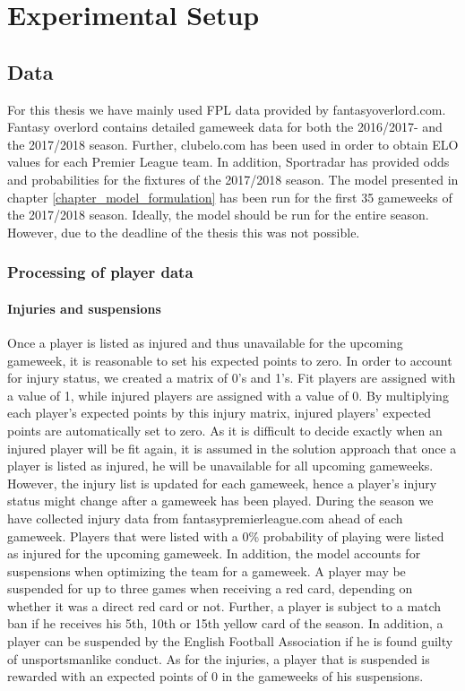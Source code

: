 \chapter{Experimental Setup}\label{chapter_experimental_setup}



\section{Data}
For this thesis we have mainly used FPL data provided by fantasyoverlord.com. Fantasy overlord contains detailed gameweek data for both the 2016/2017- and the 2017/2018 season. Further, clubelo.com has been used in order to obtain ELO values for each Premier League team. In addition, Sportradar has provided odds and probabilities for the fixtures of the 2017/2018 season. 
\newpar
The model presented in chapter \ref{chapter_model_formulation} has been run for the first 35 gameweeks of the 2017/2018 season. Ideally, the model should be run for the entire season. However, due to the deadline of the thesis this was not possible. 

\subsection{Processing of player data}
\subsubsection{Injuries and suspensions}
Once a player is listed as injured and thus unavailable for the upcoming gameweek, it is reasonable to set his expected points to zero. In order to account for injury status, we created a matrix of 0's and 1's. Fit players are assigned with a value of 1, while injured players are assigned with a value of 0. By multiplying each player's expected points by this injury matrix, injured players' expected points are automatically set to zero. As it is difficult to decide exactly when an injured player will be fit again, it is assumed in the solution approach that once a player is listed as injured, he will be unavailable for all upcoming  gameweeks. However, the injury list is updated for each gameweek, hence a player's injury status might change after a gameweek has been played. During the season we have collected injury data from fantasypremierleague.com ahead of each gameweek. Players that were listed with a 0\% probability of playing were listed as injured for the upcoming gameweek. 
\newpar
In addition, the model accounts for suspensions when optimizing the team for a gameweek. A player may be suspended for up to three games when receiving a red card, depending on whether it was a direct red card or not. Further, a player is subject to a match ban if he receives his 5th, 10th or 15th yellow card of the season. In addition, a player can be suspended by the English Football Association if he is found guilty of unsportsmanlike conduct. As for the injuries, a player that is suspended is rewarded with an expected points of 0 in the gameweeks of his suspensions. 

